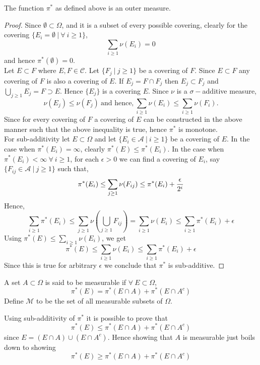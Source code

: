  \begin{proposition}\label{pro:outer}
   The function $\pi^*$ as defined above is an outer measure.
 \end{proposition}
 \begin{proof}
   Since $\emptyset \subset \Omega$, and it is a subset of every possible covering, clearly for the covering $\{E_i = \emptyset\ |\ \forall\ i\geq 1\}$,
   \[\sum_{i\geq 1} \nu(E_i) = 0\]
   and hence $\pi^*(\emptyset) = 0$.\\

   Let $E\subset F$ where $E,F \in \mathscr{C}$. Let $\{F_j\ |\ j\geq 1\}$ be a covering of $F$. Since $E\subset F$ any covering of $F$ is also a covering of $E$. If $E_j = F\cap F_j$ then $E_j \subset F_j$ and $\bigcup_{j\geq 1}E_j = F \supset E$. Hence $\{E_j\}$ is a covering $E$. Since $\nu$ is a $\sigma-$additive measure,
   \[\nu(E_j) \leq \nu(F_j)\ \text{and hence,}\ \sum_{i\geq 1}\nu(E_i) \leq \sum_{i\geq 1}\nu(F_i).\]
   Since for every covering of $F$ a covering of $E$ can be constructed in the above manner such that the above inequality is true, hence $\pi^*$ is monotone. \\

   For sub-additivity let $E \subset \Omega$ and let $\{E_i \in \mathscr{A}\ |\ i\geq 1\}$ be a covering of $E$. In the case when $\pi^*(E_i) = \infty$, clearly $\pi^*(E) \leq \pi^*(E_i)$. In the case when $\pi^*(E_i) < \infty\ \forall\ i\geq 1$, for each $\epsilon>0$ we can find a covering of $E_i$, say $\{F_{ij}\in \mathscr{A}\ |\ j\geq 1\}$ such that,
   \[\pi^*(E_i) \leq \sum_{j\geq 1} \nu(F_{ij}) \leq \pi^*(E_i) + \frac{\epsilon}{2^i}\]
   Hence,
   \[\sum_{i\geq 1}\pi^*(E_i) \leq \sum_{j\geq 1} \nu(\bigcup_{j\geq 1}F_{ij}) = \sum_{i\geq 1}\nu(E_i)\leq \sum_{i\geq 1}\pi^*(E_i) + \epsilon\]
   Using $\pi^*(E) \leq \sum_{i\geq 1}\nu(E_i)$, we get
   \[\pi^*(E) \leq \sum_{i\geq 1}\nu(E_i) \leq \sum_{i\geq 1}\pi^*(E_i) + \epsilon\]
   Since this is true for arbitrary $\epsilon$ we conclude that $\pi^*$ is sub-additive. 
 \end{proof}
 \begin{definition}
   A set $A\subset\Omega$ is said to be measurable if $\forall\ E\subset \Omega$,
   \[\pi^*(E) = \pi^*(E\cap A) + \pi^*(E\cap A^c)\]
   Define $ \mathscr{M} $ to be the set of all measurable subsets of $ \Omega$.
 \end{definition}
 \begin{remark}
   Using sub-additivity of $\pi^*$ it is possible to prove that
   \[\pi^*(E) \leq \pi^*(E\cap A) + \pi^*(E\cap A^c)\]
   since $E = (E\cap A)\cup (E\cap A^c)$. Hence showing that $A$ is measurable just boils down to showing
   \[\pi^*(E) \geq \pi^*(E\cap A) + \pi^*(E\cap A^c)\]
 \end{remark}
